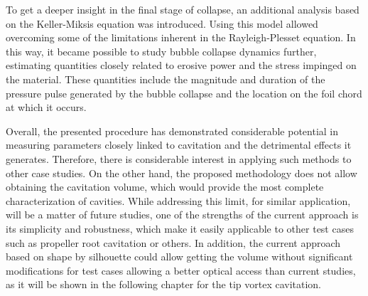 To get a deeper insight in the final stage of collapse, an additional analysis based on the Keller-Miksis equation was introduced. Using this model allowed overcoming some of the limitations inherent in the Rayleigh-Plesset equation. In this way, it became possible to study bubble collapse dynamics further, estimating quantities closely related to erosive power and the stress impinged on the material. These quantities include the magnitude and duration of the pressure pulse generated by the bubble collapse and the location on the foil chord at which it occurs.

Overall, the presented procedure has demonstrated considerable potential in measuring parameters closely linked to cavitation and the detrimental effects it generates. Therefore, there is considerable interest in applying such methods to other case studies. On the other hand, the proposed methodology does not allow obtaining the cavitation volume, which would provide the most complete characterization of cavities. While addressing this limit, for similar application, will be a matter of future studies, one of the strengths of the current approach is its simplicity and robustness, which make it easily applicable to other test cases such as propeller root cavitation or others.
In addition, the current approach based on shape by silhouette could allow getting the volume without significant modifications for test cases allowing a better optical access than current studies, as it will be shown in the following chapter for the tip vortex cavitation.